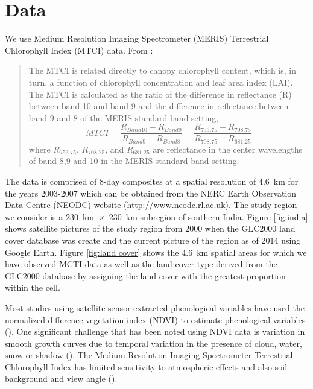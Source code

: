 \section{Data} 

\label{sec:data} We use Medium Resolution Imaging Spectrometer (MERIS) Terrestrial Chlorophyll Index (MTCI) data. From \cite{Dash:2010kva}:
\begin{quote}
The MTCI is related directly to canopy chlorophyll content, which is, in turn, a function of chlorophyll concentration and leaf area index (LAI). The MTCI is calculated as the ratio of the difference in reflectance (R) between band 10 and band 9 and the difference in reflectance between band 9 and 8 of the MERIS standard band setting,
\begin{equation}
	MTCI = \frac{R_{Band 10} - R_{Band 9}}{R_{Band 9} - R_{Band 8}} = \frac{R_{ 753.75} - R_{708.75}}{R_{ 708.75} - R_{ 681.25}} \nonumber
\end{equation}
where $R_{753.75}$, $R_{708.75}$, and $R_{681.25}$ are reflectance in the center wavelengths of band 8,9 and 10 in the MERIS standard band setting.
\end{quote}

 The data is comprised of 8-day composites at a spatial resolution of 4.6~km for the years 2003-2007 which can be obtained from the NERC Earth Observation Data Centre (NEODC) website (http://www.neodc.rl.ac.uk). The study region we consider is a 230~km~$\times$~230~km subregion of southern India. Figure \ref{fig:india} shows satellite pictures of the study region from 2000 when the GLC2000 land cover database was create and the current picture of the region as of 2014 using Google Earth. Figure \ref{fig:land cover} shows the 4.6~km spatial areas for which we have observed MCTI data as well as the land cover type derived from the GLC2000 database by assigning the land cover with the greatest proportion within the cell.  
 
 Most studies using satellite sensor extracted phenological variables have used the normalized difference vegetation index (NDVI) to estimate phenological variables (\cite{Jeyaseelan:2007dh,Saikia:2009cm}). One significant challenge that has been noted using NDVI data is variation in smooth growth curves due to temporal variation in the presence of cloud, water, snow or shadow (\cite{Goward:1985hr,Huete:2002gy}). The Medium Resolution Imaging Spectrometer Terrestrial Chlorophyll Index has limited sensitivity to atmospheric effects and also soil background and view angle (\cite{Dash:2010kva}). 

